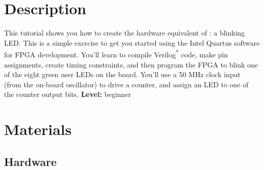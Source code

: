 \tableofcontents

\section*{Description}

\begin{flushleft}
\noindent

This tutorial shows you how to create the hardware equivalent of : a blinking LED. This is a simple exercise to get you started using the Intel\textsuperscript{\textregistered} Quartus\textsuperscript{\textregistered} software for FPGA development.
\newline
\newline
You'll learn to compile Verilog\textsuperscript{*} code, make pin assignments, create timing constraints, and then program the FPGA to blink one of the eight green user LEDs on the board. You'll use a 50 MHz clock input (from the on-board oscillator) to drive a counter, and assign an LED to one of the counter output bits.
\newline
\newline
\textbf{Level:} beginner

\end{flushleft}

\section*{Materials}

\subsection*{Hardware}

